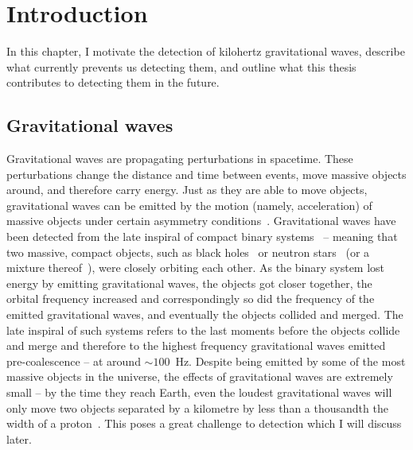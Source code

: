 \chapter{Introduction} %





In this chapter, I motivate the detection of kilohertz gravitational waves, describe what currently prevents us detecting them, and outline what this thesis contributes to detecting them in the future.

\section{Gravitational waves}
\label{sec:gravWaves}

Gravitational waves are propagating perturbations in spacetime.
These perturbations change the distance and time between events, move massive objects around, and therefore carry energy. 
Just as they are able to move objects, gravitational waves can be emitted by the motion (namely, acceleration) of massive objects under certain asymmetry conditions~\cite{}.
Gravitational waves have been detected from the late inspiral of compact binary systems~\cite{} -- meaning that two massive, compact objects, such as black holes~\cite{} or neutron stars~\cite{} (or a mixture thereof~\cite{}), were closely orbiting each other. As the binary system lost energy by emitting gravitational waves, the objects got closer together, the orbital frequency increased and correspondingly so did the frequency of the emitted gravitational waves, and eventually the objects collided and merged. The late inspiral of such systems refers to the last moments before the objects collide and merge and therefore to the highest frequency gravitational waves emitted pre-coalescence -- at around $\sim 100$~Hz. %
Despite being emitted by some of the most massive objects in the universe, the effects of gravitational waves are extremely small -- by the time they reach Earth, even the loudest gravitational waves will only move two objects separated by a kilometre by less than a thousandth the width of a proton~\cite{}. %
This poses a great challenge to detection which I will discuss later.

